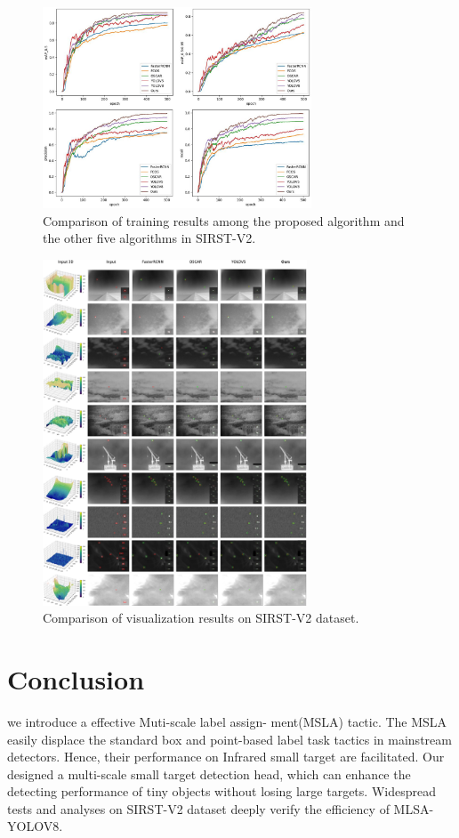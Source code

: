 \documentclass[journal]{IEEEtran}
\begin{document}
\begin{figure}[!t]
    \centering
    \includegraphics[width=8cm]{graph}
    \caption {Comparison of training results among the proposed algorithm and the other five algorithms in SIRST-V2.}

    \label{fig: graph}
\end{figure}
\begin{center}
\begin{figure}[!t]
    \centering
    \includegraphics[width=0.7\textwidth]{experience}
    \caption {Comparison of visualization results on SIRST-V2 dataset.}

    \label{fig: experience}
\end{figure}
\end{center}

\section{Conclusion}
we introduce a effective Muti-scale label assign- ment(MSLA)  tactic.  The  MSLA  easily displace the standard box and point-based label task tactics in mainstream detectors. Hence, their performance on Infrared small target are facilitated. Our designed a multi-scale small target detection head, which can enhance the detecting performance of tiny objects without losing large targets. Widespread tests and analyses on SIRST-V2 dataset deeply verify the efficiency of MLSA-YOLOV8. 


\ifCLASSOPTIONcaptionsoff
  \newpage
\fi

\printbibliography
\end{document}
